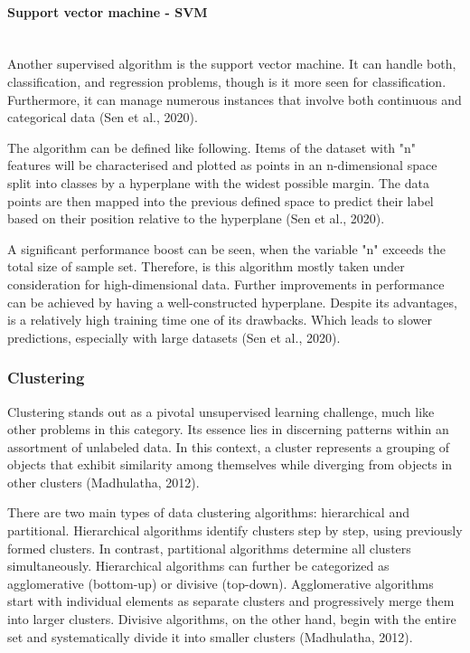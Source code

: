\documentclass{article}
\begin{document}
\begin{multicols}{2}
\paragraph*{\textbf{Support vector machine - SVM}}\mbox{}\\
Another supervised algorithm is the support vector machine. It can handle both, classification, and regression problems, though is it more seen for classification. Furthermore, it can manage numerous instances that involve both continuous and categorical data (Sen et al., 2020).

The algorithm can be defined like following. Items of the dataset with "n" features will be characterised and plotted as points in an n-dimensional space split into classes by a hyperplane with the widest possible margin. The data points are then mapped into the previous defined space to predict their label based on their position relative to the hyperplane (Sen et al., 2020).

A significant performance boost can be seen, when the variable "n" exceeds the total size of sample set. Therefore, is this algorithm mostly taken under consideration for high-dimensional data. Further improvements in performance can be achieved by having a well-constructed hyperplane. Despite its advantages, is a relatively high training time one of its drawbacks. Which leads to slower predictions, especially with large datasets (Sen et al., 2020).


\subsubsection{Clustering}

Clustering stands out as a pivotal unsupervised learning challenge, much like other problems in this category. Its essence lies in discerning patterns within an assortment of unlabeled data. In this context, a cluster represents a grouping of objects that exhibit similarity among themselves while diverging from objects in other clusters (Madhulatha, 2012).

There are two main types of data clustering algorithms: hierarchical and partitional. Hierarchical algorithms identify clusters step by step, using previously formed clusters. In contrast, partitional algorithms determine all clusters simultaneously. Hierarchical algorithms can further be categorized as agglomerative (bottom-up) or divisive (top-down). Agglomerative algorithms start with individual elements as separate clusters and progressively merge them into larger clusters. Divisive algorithms, on the other hand, begin with the entire set and systematically divide it into smaller clusters (Madhulatha, 2012).



\end{multicols}
\end{document}
